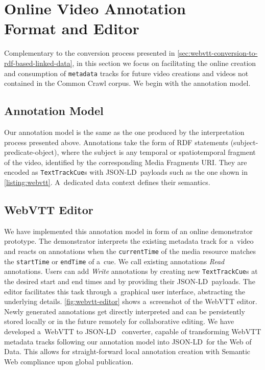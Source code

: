 \documentclass{sig-alternate}
\def\JSONLD{\mbox{JSON-LD}}
\begin{document}
\section{Online Video Annotation\\ Format and Editor}
\label{sec:online-video-annotation-format-and-editor}

Complementary to the conversion process presented
in \autoref{sec:webvtt-conversion-to-rdf-based-linked-data},
in this section we focus on facilitating the online creation and consumption
of \texttt{metadata} tracks for future video creations
and videos not contained in the Common Crawl corpus.
We begin with the annotation model.

\subsection{Annotation Model}

Our annotation model is the same as the one produced
by the interpretation process presented above.
Annotations take the form of RDF statements (subject-predicate-object),
where the subject is any temporal or spatiotemporal fragment of the video,
identified by the corresponding Media Fragments URI. 
They are encoded as \texttt{TextTrackCue}s
with \JSONLD\ payloads such as the one shown in \autoref{listing:webvtt}.
A~dedicated data context defines their semantics.

\subsection{WebVTT Editor}

We have implemented this annotation model
in form of an online demonstrator prototype.
The demonstrator interprets the existing metadata track for a~video
and reacts on annotations when the \texttt{currentTime}
of the media resource matches the
\texttt{startTime} or \texttt{endTime} of a~cue.
We call existing annotations \emph{Read} annotations.
Users can add \emph{Write} annotations
by creating new \texttt{TextTrackCue}s
at the desired start and end times
and by providing their \JSONLD~payloads.
The editor facilitates this task through a~graphical user interface, abstracting the underlying details.
\autoref{fig:webvtt-editor} shows a~screenshot of the WebVTT editor.
Newly generated annotations get directly interpreted
and can be persistently stored locally
or in the future remotely for collaborative editing.
We have developed a~WebVTT to \JSONLD~%
converter, capable of transforming WebVTT metadata tracks
following our annotation model
into \JSONLD~for the Web of Data.
This allows for straight-forward local annotation creation
with Semantic Web compliance upon global publication.
\end{document}
